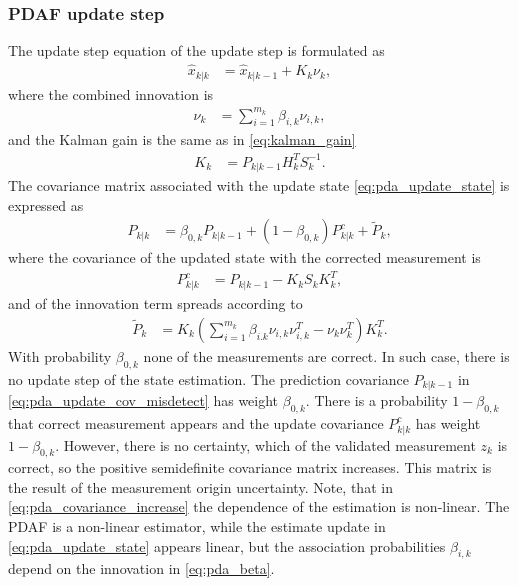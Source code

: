 \subsubsection{PDAF update step}
The update step equation of the update step is formulated as
\begin{align}
    \hat{x}_{k|k} &= \hat{x}_{k|k-1} + K_k \nu_k, \label{eq:pda_update_state}
\end{align}
where the combined innovation is
\begin{align}
    \nu_k &= \sum_{i=1}^{m_k} \beta_{i,k} \nu_{i,k},
\end{align}
and the Kalman gain is the same as in \eqref{eq:kalman_gain}
\begin{align}
    K_k &= P_{k|k-1} H_k^T S_k^{-1}.
\end{align}
The covariance matrix associated with the update state \eqref{eq:pda_update_state} is expressed as
\begin{align}
    P_{k|k} &= \beta_{0,k} P_{k|k-1} + (1-\beta_{0,k}) P_{k|k}^c + \tilde{P}_k, \label{eq:pda_update_cov_misdetect}
\end{align}
where the covariance of the updated state with the corrected measurement is
\begin{align}
    P_{k|k}^c &= P_{k|k-1} - K_k S_k K_{k}^T, \label{eq:pda_update_cov_detenct}
\end{align}
and of the innovation term spreads according to
\begin{align}
    \tilde{P}_k &= K_k (\sum_{i=1}^{m_k} \beta_{i.k} \nu_{i,k} \nu_{i,k}^T - \nu_{k} \nu_{k}^T) K_k^T. \label{eq:pda_covariance_increase}
\end{align}
With probability $\beta_{0,k}$ none of the measurements are correct. In such case, there is no update step of the
state estimation. The prediction covariance $P_{k|k-1}$ in \eqref{eq:pda_update_cov_misdetect} has weight $\beta_{0,k}$. There
is a probability $1-\beta_{0,k}$ that correct measurement appears and the update covariance $P_{k|k}^c$ has weight $1-\beta_{0,k}$. However, there is no certainty, which of the validated measurement $z_k$ is correct, so the positive semidefinite covariance matrix increases. This matrix is the result of the measurement origin uncertainty. Note, that in \eqref{eq:pda_covariance_increase} the dependence of the estimation is non-linear. The PDAF is a non-linear estimator, while the estimate update in \eqref{eq:pda_update_state} appears linear, but the association probabilities $\beta_{i,k}$ depend on the innovation in \eqref{eq:pda_beta}.



